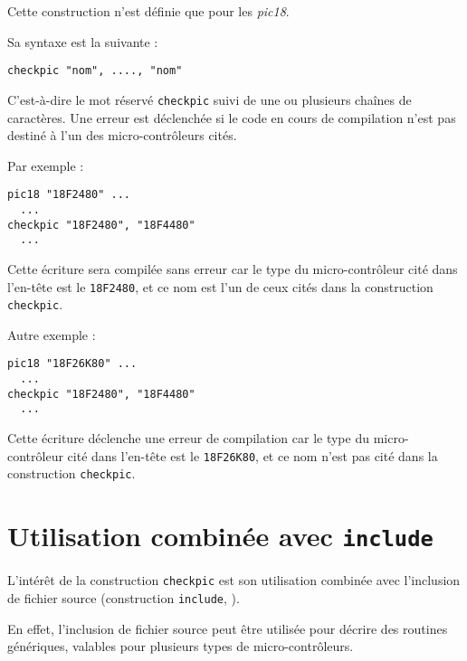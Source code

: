 
\cleardoublepage


\thispagestyle{empty}

Cette construction n'est définie que pour les \emph{pic18}.

Sa syntaxe est la suivante :

\begin{lstlisting}[language=piccolo]
checkpic "nom", ...., "nom"
\end{lstlisting}

C'est-à-dire le mot réservé \texttt{checkpic} suivi de une ou plusieurs chaînes de caractères. Une erreur est déclenchée si le code en cours de compilation n'est pas destiné à l'un des micro-contrôleurs cités.

Par exemple :

\begin{lstlisting}[language=piccolo]
pic18 "18F2480" ...
  ...
checkpic "18F2480", "18F4480"
  ...
\end{lstlisting}

Cette écriture sera compilée sans erreur car le type du micro-contrôleur cité dans l'en-tête est le \texttt{18F2480}, et ce nom est l'un de ceux cités dans la construction \texttt{checkpic}.

Autre exemple :

\begin{lstlisting}[language=piccolo]
pic18 "18F26K80" ...
  ...
checkpic "18F2480", "18F4480"
  ...
\end{lstlisting}

Cette écriture déclenche une erreur de compilation car le type du micro-contrôleur cité dans l'en-tête est le \texttt{18F26K80}, et ce nom n'est pas cité dans la construction \texttt{checkpic}.




\section{Utilisation combinée avec \texttt{include}}
L'intérêt de la construction \texttt{checkpic} est son utilisation combinée avec l'inclusion de fichier source (construction \texttt{include}, ).

En effet, l'inclusion de fichier source peut être utilisée pour décrire des routines génériques, valables pour plusieurs types de micro-contrôleurs.

